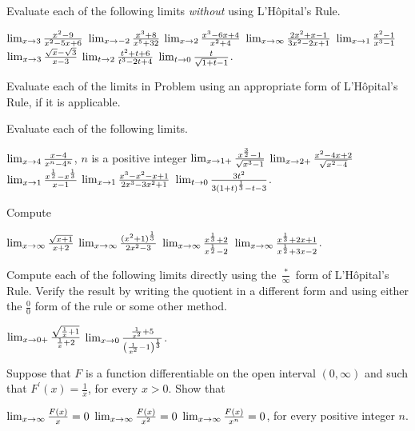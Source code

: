 \begin{exercises}

Evaluate each of the following limits \emph{without}
using L'H\^opital's Rule.
\begin{exenum}
\sx
$\lim_{x \rightarrow 3} \frac{x^2 - 9}{x^2 - 5x + 6}$
\sx
$\lim_{x \rightarrow -2} \frac{x^3 + 8}{x^5+32}$
\sx
$\lim_{x \rightarrow 2} \frac{x^3 - 6x + 4}{x^2 + 4}$
\sx
$\lim_{x \rightarrow \infty} \frac{2x^2 + x - 1}{3x^2 - 2x + 1}$
\sx
$\lim_{x \rightarrow 1} \frac{x^2 - 1}{x^3 - 1}$
\sx
$\lim_{x \rightarrow 3} \frac{\sqrt x - \sqrt3}{x-3}$
\sx
$\lim_{t \rightarrow 2} \frac{t^2 + t + 6}{t^3 - 2t + 4}$
\sx
$\lim_{t \rightarrow 0} \frac t{\sqrt{1+t}-1}$.
\end{exenum}

Evaluate each of the limits in Problem 
using an appropriate form of L'H\^opital's Rule,
if it is applicable.

Evaluate each of the following limits.
\begin{exenum}
\sx
$\lim_{x \rightarrow 4} \frac{x-4}{x^n-4^n}$,
$n$ is a positive integer
\sx
$\lim_{x \rightarrow 1+} \frac{x^\frac32 - 1}{\sqrt{x^3-1}}$
\sx
$\lim_{x \rightarrow 2+} \frac{x^2 - 4x + 2}{\sqrt{x^2 - 4}}$
\sx
$\lim_{x \rightarrow 1} \frac{x^\frac12-x^\frac13}{x-1}$
\sx
$\lim_{x \rightarrow 1} \frac{x^3-x^2-x+1}{2x^3-3x^2+1}$
\sx
$\lim_{t \rightarrow 0} \frac{3t^2}{3(1+t)^\frac13-t-3}$.
\end{exenum}

Compute
\begin{exenum}
\sx
$\lim_{x \rightarrow \infty} \frac{\sqrt{x+1}}{x+2}$
\sx
$\lim_{x \rightarrow \infty} \frac{(x^2+1)^\frac13}{2x^2-3}$
\sx
$\lim_{x \rightarrow \infty} \frac{x^\frac13 + 2}{x^\frac12 - 2}$
\sx
$\lim_{x \rightarrow \infty} \frac{x^\frac13+ 2x+1}{x^\frac12+3x-2}$.
\end{exenum}

Compute each of the following limits directly using the
$\frac*\infty$ form of L'H\^opital's Rule.  Verify the result
by writing the quotient in a different form and using
either the $\frac00$ form of the rule or some other method.
\begin{exenum}
\sx
$\lim_{x \rightarrow 0+} \frac{\sqrt{\frac1x + 1}}{\frac1x+2}$
\sx
$\lim_{x \rightarrow 0} \frac {\frac1{x^2}+5}
{\left( \frac1{x^2}-1 \right)^\frac13}$.
\end{exenum}

Suppose that $F$ is a function differentiable on the open
interval $(0, \infty)$ and such that $F^\prime(x) = \frac1x$,
for every $x>0$.  Show that
\begin{exenum}
\sx
$\lim_{x \rightarrow \infty} \frac{F(x)}x = 0$
\sx
$\lim_{x \rightarrow \infty} \frac{F(x)}{x^2} = 0$
\sx
$\lim_{x \rightarrow \infty} \frac{F(x)}{x^n} = 0$,
for every positive integer $n$.
\end{exenum}

\end{exercises}
